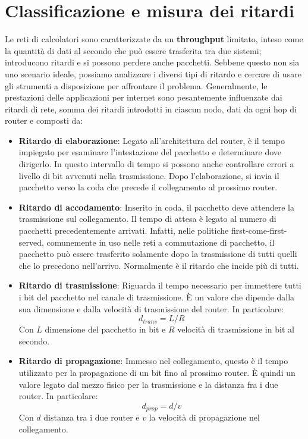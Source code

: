 \section{Classificazione e misura dei ritardi}
Le reti di calcolatori sono caratterizzate da un \textbf{throughput} limitato, inteso come la quantità di dati al secondo che può essere trasferita tra due sistemi; introducono ritardi e si possono perdere anche pacchetti. Sebbene questo non sia uno scenario ideale, possiamo analizzare i diversi tipi di ritardo e cercare di usare gli strumenti a disposizione per affrontare il problema. Generalmente, le prestazioni delle applicazioni per internet sono pesantemente influenzate dai ritardi di rete, somma dei ritardi introdotti in ciascun nodo, dati da ogni hop di router e composti da: \begin{itemize}
	\item \textbf{Ritardo di elaborazione}: Legato all'architettura del router, è il tempo impiegato per esaminare l'intestazione del pacchetto e determinare dove dirigerlo. In questo intervallo di tempo si possono anche controllare errori a livello di bit avvenuti nella trasmissione. Dopo l'elaborazione, si invia il pacchetto verso la coda che precede il collegamento al prossimo router.
	\item \textbf{Ritardo di accodamento}: Inserito in coda, il pacchetto deve attendere la trasmissione sul collegamento. Il tempo di attesa è legato al numero di pacchetti precedentemente arrivati. Infatti, nelle politiche first-come-first-served, comunemente in uso nelle reti a commutazione di pacchetto, il pacchetto può essere trasferito solamente dopo la trasmissione di tutti quelli che lo precedono nell'arrivo. Normalmente è il ritardo che incide più di tutti.
	\item \textbf{Ritardo di trasmissione}: Riguarda il tempo necessario per immettere tutti i bit del pacchetto nel canale di trasmissione. È un valore che dipende dalla sua dimensione e dalla velocità di trasmissione del router. In particolare: \[d_{trans} = L/R\]
	\noindent Con $L$ dimensione del pacchetto in bit e $R$ velocità di trasmissione in bit al secondo.
	\item \textbf{Ritardo di propagazione}: Immesso nel collegamento, questo è il tempo utilizzato per la propagazione di un bit fino al prossimo router. È quindi un valore legato dal mezzo fisico per la trasmissione e la distanza fra i due router. In particolare: \[d_{prop} = d/v\]
	\noindent Con $d$ distanza tra i due router e $v$ la velocità di propagazione nel collegamento.
\end{itemize}
